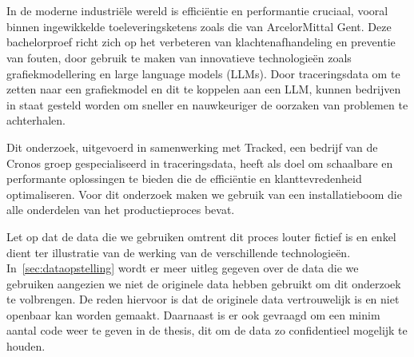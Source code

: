 
\chapter{}%
\label{ch:inleiding}

In de moderne industriële wereld is efficiëntie en performantie cruciaal, vooral binnen ingewikkelde toeleveringsketens zoals die van ArcelorMittal Gent. 
Deze bachelorproef richt zich op het verbeteren van klachtenafhandeling en preventie van fouten, door gebruik te maken van innovatieve technologieën zoals grafiekmodellering en large language models (LLMs). 
Door traceringsdata om te zetten naar een grafiekmodel en dit te koppelen aan een LLM, kunnen bedrijven in staat gesteld worden om sneller en nauwkeuriger de oorzaken van problemen te achterhalen. 

Dit onderzoek, uitgevoerd in samenwerking met Tracked, een bedrijf van de Cronos groep gespecialiseerd in traceringsdata, heeft als doel om schaalbare en performante oplossingen te bieden die de efficiëntie en klanttevredenheid optimaliseren.
Voor dit onderzoek maken we gebruik van een installatieboom die alle onderdelen van het productieproces bevat.

Let op dat de data die we gebruiken omtrent dit proces louter fictief is en enkel dient ter illustratie van de werking van de verschillende technologieën.
In~\ref{sec:dataopstelling} wordt er meer uitleg gegeven over de data die we gebruiken aangezien we niet de originele data hebben gebruikt om dit onderzoek te volbrengen.
De reden hiervoor is dat de originele data vertrouwelijk is en niet openbaar kan worden gemaakt. 
Daarnaast is er ook gevraagd om een minim aantal code weer te geven in de thesis, dit om de data zo confidentieel mogelijk te houden.

\section{}%
\label{sec:probleemstelling}

